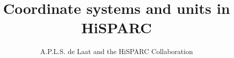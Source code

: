 \title{Coordinate systems and units in HiSPARC}

\author{A.P.L.S. de Laat and the HiSPARC Collaboration}



\maketitle



\printbibliography


